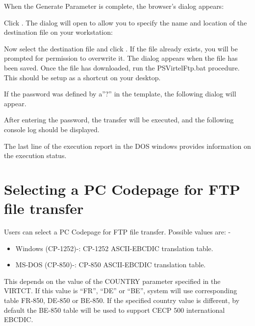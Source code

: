 \documentclass[letterpaper,10pt,english]{sphinxmanual}
\begin{document}
When the Generate Parameter is complete, the browser’s  dialog appears:



Click . The  dialog will open to allow you to specify the name and location of the destination file on your workstation:



Now select the destination file and click . If the file already exists, you will be prompted for permission to overwrite it. The  dialog appears when the file has been saved. Once the file has downloaded, run the PSVirtelFtp.bat procedure. This should be setup as a shortcut on your desktop.

If the password was defined by a”?” in the template, the following dialog will appear.


After entering the password, the transfer will be executed, and the following console log should be displayed.


The last line of the execution report in the DOS windows provides information on the execution status.


\section{Selecting a PC Codepage for FTP file transfer}
\label{\detokenize{TN201905:selecting-a-pc-codepage-for-ftp-file-transfer}}
Users can select a PC Codepage for FTP file transfer. Possible values are: -
\begin{itemize}
\item {} 
Windows (CP-1252)-: CP-1252 ASCII-EBCDIC translation table.

\item {} 
MS-DOS (CP-850)-: CP-850 ASCII-EBCDIC translation table.

\end{itemize}

This depends on the value of the COUNTRY parameter specified in the VIRTCT. If this value is “FR”, “DE” or “BE”, system will use corresponding table FR-850, DE-850 or BE-850. If the specified country value is different, by default the BE-850 table will be used to support CECP 500 international EBCDIC.
\end{document}
